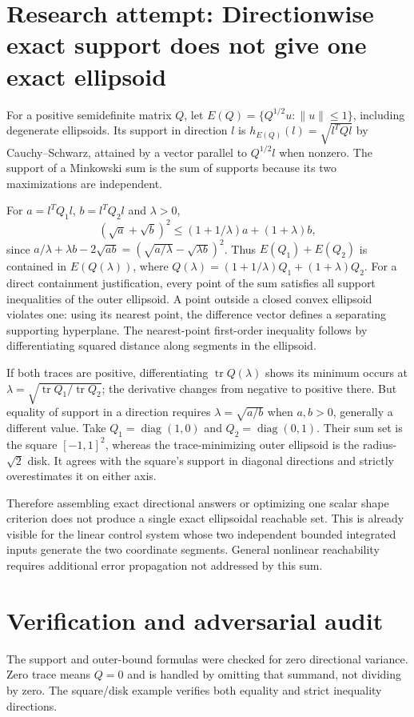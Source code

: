 \documentclass[11pt]{article}
\begin{document}
\section{Research attempt: Directionwise exact support does not give one exact ellipsoid}
For a positive semidefinite matrix $Q$, let $E(Q)=\{Q^{1/2}u:\|u\|\le1\}$,
including degenerate ellipsoids. Its support in direction $l$ is
$h_{E(Q)}(l)=\sqrt{l^TQl}$ by Cauchy--Schwarz, attained by a vector parallel
to $Q^{1/2}l$ when nonzero. The support of a Minkowski sum is the sum of
supports because its two maximizations are independent.

For $a=l^TQ_1l$, $b=l^TQ_2l$ and $\lambda>0$,
\[
 (\sqrt a+\sqrt b)^2\le(1+1/\lambda)a+(1+\lambda)b,
\]
since $a/\lambda+\lambda b-2\sqrt{ab}=(\sqrt{a/\lambda}-\sqrt{\lambda b})^2$.
Thus $E(Q_1)+E(Q_2)$ is contained in $E(Q(\lambda))$, where
$Q(\lambda)=(1+1/\lambda)Q_1+(1+\lambda)Q_2$.
For a direct containment justification, every point of the sum satisfies all
support inequalities of the outer ellipsoid. A point outside a closed convex
ellipsoid violates one: using its nearest point, the difference vector defines
a separating supporting hyperplane. The nearest-point first-order inequality
follows by differentiating squared distance along segments in the ellipsoid.

If both traces are positive, differentiating
$\operatorname{tr}Q(\lambda)$ shows its minimum occurs at
$\lambda=\sqrt{\operatorname{tr}Q_1/\operatorname{tr}Q_2}$; the derivative
changes from negative to positive there. But equality of support in a direction
requires $\lambda=\sqrt{a/b}$ when $a,b>0$, generally a different value.
Take $Q_1=\operatorname{diag}(1,0)$ and $Q_2=\operatorname{diag}(0,1)$.
Their sum set is the square $[-1,1]^2$, whereas the trace-minimizing outer
ellipsoid is the radius-$\sqrt2$ disk. It agrees with the square's support in
diagonal directions and strictly overestimates it on either axis.

Therefore assembling exact directional answers or optimizing one scalar shape
criterion does not produce a single exact ellipsoidal reachable set. This is
already visible for the linear control system whose two independent bounded
integrated inputs generate the two coordinate segments. General nonlinear
reachability requires additional error propagation not addressed by this sum.
\section{Verification and adversarial audit}
The support and outer-bound formulas were checked for zero directional
variance. Zero trace means $Q=0$ and is handled by omitting that summand, not
dividing by zero. The square/disk example verifies both equality and strict
inequality directions.
\end{document}
